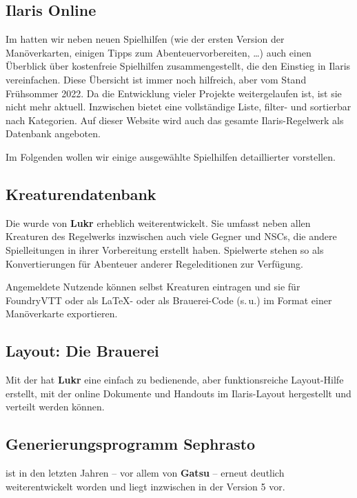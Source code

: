 \spaltenanfang
\subsection{Ilaris Online}
Im 
hatten wir neben neuen Spielhilfen (wie der ersten Version der Manöverkarten, einigen Tipps zum Abenteuervorbereiten, \dots) auch einen Überblick über kostenfreie Spielhilfen zusammengestellt, die den Einstieg in Ilaris vereinfachen.
Diese Übersicht ist immer noch hilfreich, aber vom Stand Früh\-som\-mer 2022.
Da die Entwicklung vieler Projekte weitergelaufen ist, ist sie nicht mehr aktuell.
Inzwischen bietet  eine vollständige Liste, filter- und sortierbar nach Kategorien.
Auf dieser Website wird auch das gesamte Ilaris-Regelwerk als Datenbank angeboten.

Im Folgenden wollen wir einige ausgewählte Spielhilfen detaillierter vorstellen.

\subsection*{Kreaturendatenbank}
Die  wurde von \textbf{Lukr} erheblich weiterentwickelt.
Sie umfasst neben allen Kreaturen des Regelwerks inzwischen auch viele Gegner und NSCs, die andere Spielleitungen in ihrer Vorbereitung erstellt haben.
Spielwerte stehen so als Konvertierungen für Abenteuer anderer Regeleditionen zur Verfügung.

Angemeldete Nutzende können selbst Kreaturen eintragen und sie für FoundryVTT oder als LaTeX- oder als Brauerei-Code (s.\,u.) im Format einer Manöverkarte exportieren.




\subsection*{Layout: Die Brauerei}
Mit der  hat \textbf{Lukr} eine einfach zu bedienende, aber funktionsreiche Layout-Hilfe erstellt, mit der online Dokumente und Handouts im Ilaris-Layout hergestellt und verteilt werden können.


\subsection*{Generierungsprogramm Sephrasto}
 ist in den letzten Jahren
-- vor allem von \textbf{Gatsu} --
erneut deutlich weiterentwickelt worden und liegt inzwischen in der Version 5 vor.

